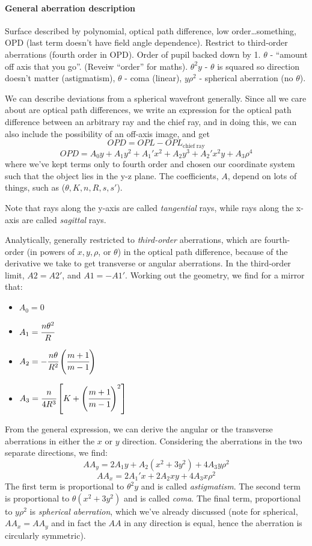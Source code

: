 \documentclass[12pt]{article}
\newcommand{\mynotes}[1]{\textcolor{myBlue}{#1}}
\begin{document}
\paragraph{General aberration description}
\mynotes{%
    Surface described by polynomial, optical path difference, low
    order\ldots something, OPD (last term doesn't have field angle
    dependence). Restrict to third-order aberrations (fourth order
    in OPD). Order of pupil backed down by 1. $\theta$ - ``amount off
    axis that you go''. (Reveiw ``order'' for maths). $\theta^{2}y$ -
    $\theta$ is squared so direction doesn't matter (astigmatism),
    $\theta$ - coma (linear), $y\rho^{2}$ - spherical aberration
    (no $\theta$).
}

We can describe deviations from a spherical wavefront generally. Since
all we care about are optical path differences, we write an expression
for the optical path difference between an arbitrary ray and the chief
ray, and in doing this, we can also include the possibility of an
off-axis image, and get
\[
    OPD = OPL - OPL_{\mathrm{chief\;ray}}
    \]
\[
    OPD
    = A_{0}y + A_{1}y^{2} + A_{1}'x^{2} + A_{2}y^{3}
    + A_{2}'x^{2}y + A_{3}\rho^{4}
    \]
where we've kept terms only to fourth order and chosen our coordinate
system such that the object lies in the y-z plane. The coefficients,
$A$, depend on lots of things, such as ($\theta, K, n, R, s, s'$).

Note that rays along the y-axis are called \textit{tangential} rays,
while rays along the x-axis are called \textit{sagittal} rays.

Analytically, generally restricted to \textit{third-order} aberrations, which
are fourth-order (in powers of $x, y, \rho$, or $\theta$) in the optical path
difference, because of the derivative we take to get transverse or angular
aberrations. In the third-order limit, $A2 = A2'$, and $A1 = -A1'$. Working out
the geometry, we find for a mirror that:
\begin{itemize}
    \item $A_{0} = 0 $
    \item $A_{1} = \cfrac{n\theta^{2}}{R}$
    \item $A_{2} = -\cfrac{n\theta}{R^{2}}\left(\cfrac{m+1}{m-1}\right)$
    \item $A_{3} = \cfrac{n}{4R^{3}}\left[K+\left(\cfrac{m+1}{m-1}\right)^{2}\right]$
\end{itemize}
From the general expression, we can derive the angular or the
transverse aberrations in either the $x$ or $y$ direction. Considering the
aberrations in the two separate directions, we find:
\[
    AA_{y} = 2A_{1}y + A_{2}(x^{2}+3y^{2}) + 4A_{3}y\rho^{2}
    \]
\[
    AA_{x} = 2A_{1}'x + 2A_{2}xy + 4A_{3}x\rho^{2}
    \]
The first term is proportional to $\theta^{2}y$ and is called
\textit{astigmatism}. The second term is proportional to $ \theta(x^{2}
+3y^{2})$ and is called \textit{coma}. The final term, proportional to
$y\rho^{2}$ is \textit{spherical aberration}, which we've already discussed
(note for spherical, $AA_{x} = AA_{y}$ and in fact the $AA$ in any direction is
equal, hence the aberration is circularly symmetric).
\end{document}
